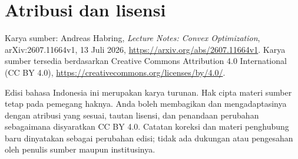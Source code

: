 \documentclass[indonesian]{shinybook}
\begin{document}
\chapter*{Atribusi dan lisensi}
Karya sumber: Andreas Habring, \emph{Lecture Notes: Convex Optimization}, arXiv:2607.11664v1, 13 Juli 2026, \url{https://arxiv.org/abs/2607.11664v1}. Karya sumber tersedia berdasarkan Creative Commons Attribution 4.0 International (CC BY 4.0), \url{https://creativecommons.org/licenses/by/4.0/}.

Edisi bahasa Indonesia ini merupakan karya turunan. Hak cipta materi sumber tetap pada pemegang haknya. Anda boleh membagikan dan mengadaptasinya dengan atribusi yang sesuai, tautan lisensi, dan penandaan perubahan sebagaimana disyaratkan CC BY 4.0. Catatan koreksi dan materi penghubung baru dinyatakan sebagai perubahan edisi; tidak ada dukungan atau pengesahan oleh penulis sumber maupun institusinya.
\end{document}
